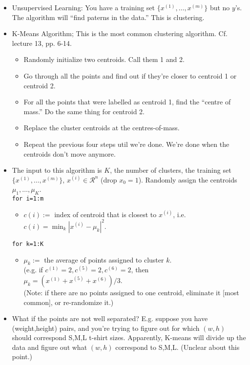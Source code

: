 \documentclass[10pt]{article}
\begin{document}
\begin{itemize}
  \item Unsupervised Learning: You have a training set $\{ x^{(1)},\dots,x^{(m)}\}$ but no $y$'s. The algorithm will ``find paterns in the data.'' This is clustering.
  \item K-Means Algorithm; This is the most common clustering algorithm. Cf. lecture 13, pp. 6-14.
    \begin{itemize}
      \item Randomly initialize two centroids.  Call them 1 and 2.
      \item Go through all the points and find out if they're closer to centroid 1 or centroid 2. 
      \item For all the points that were labelled as centroid 1, find the ``centre of mass.'' Do the same thing for centroid 2.
      \item Replace the cluster centroids at the centres-of-mass.
      \item Repeat the previous four steps util we're done. We're done when the centroids don't move anymore.
    \end{itemize}
  \item The input to this algorithm is $K$, the number of clusters, the training set $\{ x^{(1)},\dots,x^{(m)}\}$, $x^{(i)} \in \mathcal{R}^n$ (drop $x_0=1$). Randomly assign the centroids $\mu_1, \dots, \mu_K$. \\
    \texttt{for i=1:m}
    \begin{itemize}
      \item $c(i):=$ index of centroid that is closest to $x^{(i)}$, i.e. $c(i) = \min_k \left| x^{(i)} - \mu_k \right|^2$.
    \end{itemize}
    \texttt{for k=1:K}
    \begin{itemize}
      \item $\mu_k:=$ the average of points assigned to cluster $k$. \\ (e.g. if $c^{(1)}=2, c^{(5)}=2, c^{(6)}=2$, then $\mu_k = (x^{(1)} + x^{(5)} + x^{(6)})/3$. \\
        (Note: if there are no points assigned to one centroid, eliminate it [most common], or re-randomize it.)
    \end{itemize}
  \item What if the points are not well separated? E.g. suppose you
    have (weight,height) pairs, and you're trying to figure out for
    which $(w,h)$ should correspond S,M,L t-shirt sizes. Apparently,
    K-means will divide up the data and figure out what $(w,h)$
    correspond to S,M,L. (Unclear about this point.)
\end{itemize}
\end{document}
